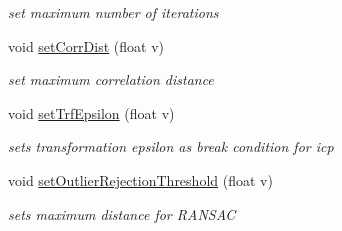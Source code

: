 \begin{DoxyCompactItemize}
\begin{DoxyCompactList}\small\item\em set maximum number of iterations \item\end{DoxyCompactList}\item 
\hypertarget{classRegistration__ICP_a24520c9711a60d047c107664426e7d33}{
void \hyperlink{classRegistration__ICP_a24520c9711a60d047c107664426e7d33}{setCorrDist} (float v)}
\label{classRegistration__ICP_a24520c9711a60d047c107664426e7d33}

\begin{DoxyCompactList}\small\item\em set maximum correlation distance \item\end{DoxyCompactList}\item 
\hypertarget{classRegistration__ICP_aa13488b9d37d5edf16baaf3de11242ba}{
void \hyperlink{classRegistration__ICP_aa13488b9d37d5edf16baaf3de11242ba}{setTrfEpsilon} (float v)}
\label{classRegistration__ICP_aa13488b9d37d5edf16baaf3de11242ba}

\begin{DoxyCompactList}\small\item\em sets transformation epsilon as break condition for icp \item\end{DoxyCompactList}\item 
\hypertarget{classRegistration__ICP_a648647c59a5693170332c17e328dec39}{
void \hyperlink{classRegistration__ICP_a648647c59a5693170332c17e328dec39}{setOutlierRejectionThreshold} (float v)}
\label{classRegistration__ICP_a648647c59a5693170332c17e328dec39}

\begin{DoxyCompactList}\small\item\em sets maximum distance for RANSAC \item\end{DoxyCompactList}\end{DoxyCompactItemize}
